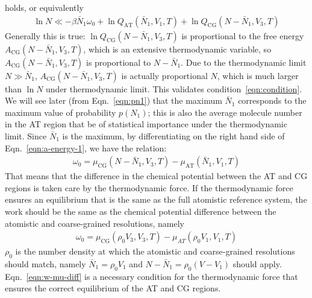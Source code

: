 \documentclass[aip,jcp,a4paper,reprint,onecolumn]{revtex4-1}
\newcommand{\recheck}[1]{{\color{red} #1}}
\newcommand{\AT}{{\textrm{{AT}}}}
\newcommand{\CG}{{\textrm{CG}}}
\begin{document}
holds, or equivalently
\begin{align}\label{eqn:condition}
  \ln N 
  \ll
  -\beta \bar N_1\omega_0 +
  \ln Q_{\AT}(\bar N_1, V_1, T) + \ln Q_{\CG}(N - \bar N_1, V_3, T)
\end{align}
Generally this is true: $\ln Q_{\CG}(N - \bar N_1, V_3, T)$
is proportional to the free energy $A_{\CG}(N - \bar N_1, V_3, T)$,
which is an extensive thermodynamic variable, so
$A_{\CG}(N - \bar N_1, V_3, T)$ is proportional to $N-\bar N_1$.
Due to the thermodynamic limit $N \gg \bar N_1$,
$A_{\CG}(N - \bar N_1, V_3, T)$ is actually proportional $N$, which
is much larger than $\ln N$ under thermodynamic limit. This
validates condition~\eqref{eqn:condition}.
We will see later (from Eqn.~\eqref{eqn:pn1})
that the maximum $\bar N_1$ corresponds to the maximum
value of probability $p(N_1)$; this is also the average molecule
number in the AT region that be of statistical importance
under the thermodynamic limit.  Since $\bar
N_1$ is the maximum, by differentiating on the right hand side of
Eqn.~\eqref{eqn:a-energy-1}, we have the relation:
\begin{align}
  \omega_0 = \mu_{\CG}(N - \bar N_1, V_3, T)  - \mu_{\AT}(\bar N_1, V_1, T)
\end{align}
That means that the difference in the chemical potential between the AT and CG
regions is taken care by the thermodynamic force.
If the thermodynamic force ensures an
equilibrium that is the same as the full atomistic reference system,
the work should be the same as the
chemical potential difference between the atomistic and coarse-grained
resolutions, namely
\begin{align}\label{eqn:w-mu-diff}
  \omega_0 = \mu_{\CG}(\rho_0V_3, V_3, T) - \mu_{AT}(\rho_0 V_1, V_1, T)
\end{align}
$\rho_0$ is the number density at which the atomistic and coarse-grained
resolutions should match,
namely $\bar N_1 = \rho_0V_1$ and $N - \bar N_1 = \rho_0(V - V_1)$ should apply.
Eqn.~\eqref{eqn:w-mu-diff} is a necessary
condition for the thermodynamic force that ensures
the correct equilibrium of the AT and CG regions.\\
\end{document}
